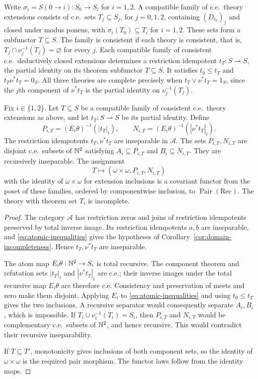 Write $\sigma_i=S(0\to i):S_0\to S_i$ for $i=1,2$.
A compatible family of c.e.\ theory extensions consists of c.e.\ sets
$T_j\subseteq S_j$, for $j=0,1,2$, containing $(D_{t_0})_j$ and closed
under modus ponens, with $\sigma_i(T_0)\subseteq T_i$ for $i=1,2$.
These sets form a subfunctor $T\subseteq S$.
The family is consistent if each theory is consistent, that is,
$T_j\cap\nu_j^{-1}(T_j)=\varnothing$ for every $j$.
Each compatible family of consistent c.e.\ deductively closed extensions
determines a restriction idempotent $t_T:S\rightharpoonup S$, the partial
identity on its theorem subfunctor $T\subseteq S$.
It satisfies $t_0\le t_T$ and $t_T\nu^*t_T=0_S$.
All three theories are complete precisely when
$t_T\vee\nu^*t_T=1_S$, since the $j$th component of $\nu^*t_T$
is the partial identity on $\nu_j^{-1}(T_j)$.

\begin{theorem}\label{thm:cosheaf-observation}
Fix $i\in\{1,2\}$. Let $T\subseteq S$ be a compatible family of
consistent c.e.\ theory extensions as above, and let
$t_T:S\rightharpoonup S$ be its partial identity. Define
\[
 P_{i,T}=(E_i\theta)^{-1}(|t_T|_i),\qquad
 N_{i,T}=(E_i\theta)^{-1}(|\nu^*t_T|_i).
\]
The restriction idempotents $t_T,\nu^*t_T$ are inseparable in $\mathcal A$.
The sets $P_{i,T},N_{i,T}$ are disjoint c.e.\ subsets of $\mathbb N^2$ satisfying
$A_i\subseteq P_{i,T}$ and $B_i\subseteq N_{i,T}$.
They are recursively inseparable. The assignment
\[
 T\longmapsto(\omega\times\omega,P_{i,T},N_{i,T})
\]
with the identity of $\omega\times\omega$ for extension inclusions is a
covariant functor from the poset of these families, ordered by componentwise
inclusion, to $\operatorname{Pair}(\mathrm{Rec})$.
The theory with theorem set $T_i$ is incomplete.
\end{theorem}
\begin{proof}
The category $\mathcal A$ has restriction zeros and joins of restriction idempotents
preserved by total inverse image. Its restriction idempotents $a,b$ are inseparable,
and \eqref{eq:atomic-inequalities} gives the hypotheses of
Corollary~\ref{cor:domain-incompleteness}. Hence $t_T,\nu^*t_T$ are
inseparable.

The atom map $E_i\theta:\mathbb N^2\to S_i$ is total recursive.
The component theorem and refutation sets $|t_T|_i$ and $|\nu^*t_T|_i$
are c.e.; their inverse images under the total recursive map
$E_i\theta$ are therefore c.e. Consistency and preservation of meets and
zero make them disjoint. Applying $E_i$ to
\eqref{eq:atomic-inequalities} and using $t_0\le t_T$ gives
the two inclusions. A recursive separator would consequently
separate $A_i,B_i$, which is impossible.
If $T_i\cup\nu_i^{-1}(T_i)=S_i$, then $P_{i,T}$ and $N_{i,T}$
would be complementary c.e.\ subsets of $\mathbb N^2$, and hence recursive.
This would contradict their recursive inseparability.

If $T\subseteq T'$, monotonicity gives inclusions of both component
sets, so the identity of $\omega\times\omega$ is the required pair morphism.
The functor laws follow from the identity maps.
\end{proof}

